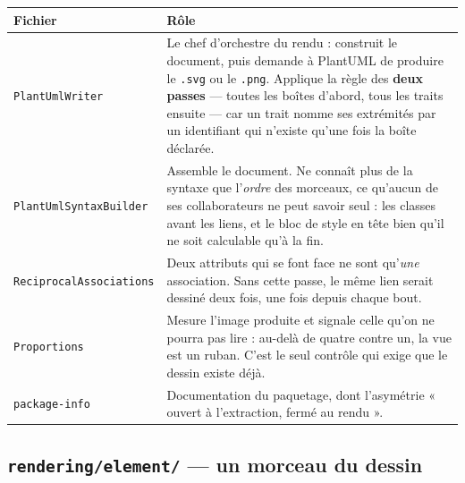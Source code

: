 \documentclass[12pt, a4paper]{article}
\begin{document}
\begin{longtable}{L{4.2cm} L{10cm}}
\toprule
\textbf{Fichier} & \textbf{Rôle} \\
\midrule
\endhead
\texttt{PlantUmlWriter} &
Le chef d'orchestre du rendu : construit le document, puis demande à PlantUML de produire le
\texttt{.svg} ou le \texttt{.png}. Applique la règle des \textbf{deux passes} — toutes les
boîtes d'abord, tous les traits ensuite — car un trait nomme ses extrémités par un identifiant
qui n'existe qu'une fois la boîte déclarée. \\
\addlinespace
\texttt{PlantUmlSyntaxBuilder} &
Assemble le document. Ne connaît plus de la syntaxe que l'\emph{ordre} des morceaux, ce
qu'aucun de ses collaborateurs ne peut savoir seul : les classes avant les liens, et le bloc de
style en tête bien qu'il ne soit calculable qu'à la fin. \\
\addlinespace
\texttt{ReciprocalAssociations} &
Deux attributs qui se font face ne sont qu'\emph{une} association. Sans cette passe, le même lien
serait dessiné deux fois, une fois depuis chaque bout. \\
\addlinespace
\texttt{Proportions} &
Mesure l'image produite et signale celle qu'on ne pourra pas lire : au-delà de quatre contre un,
la vue est un ruban. C'est le seul contrôle qui exige que le dessin existe déjà. \\
\addlinespace
\texttt{package-info} &
Documentation du paquetage, dont l'asymétrie « ouvert à l'extraction, fermé au rendu ». \\
\bottomrule
\end{longtable}

\subsection{\texttt{rendering/element/} — un morceau du dessin}
\end{document}
